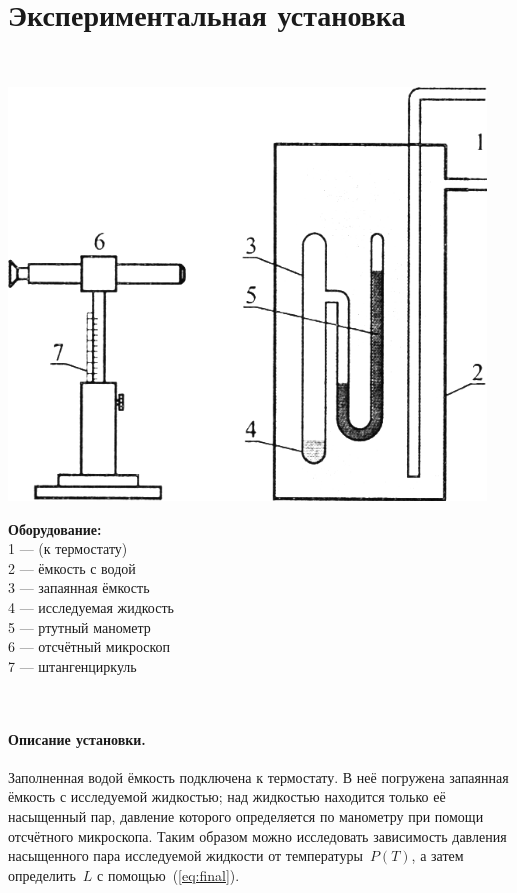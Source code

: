 \documentclass[12pt]{article}
\begin{document}
		\section*{Экспериментальная установка}
		~\hfill
		\begin{minipage}{0.35\textwidth}
			\includegraphics[width=0.95\textwidth]{apparatus}
		\end{minipage}
		\hfill
		\begin{minipage}{0.35\textwidth}
			\textbf{Оборудование:} \\[.5ex]
			1 --- (к термостату) \\
			2 --- ёмкость с водой \\
			3 --- запаянная ёмкость \\
			4 --- исследуемая жидкость \\
			5 --- ртутный манометр \\
			6 --- отсчётный микроскоп \\
			7 --- штангенциркуль
		\end{minipage}
		\hfill~
		
		\bigskip
		\paragraph{Описание установки.} Заполненная водой ёмкость подключена
		к термостату. В неё погружена запаянная ёмкость с исследуемой жидкостью;
		над жидкостью находится только её насыщенный пар, давление которого
		определяется по манометру при помощи отсчётного микроскопа.
		Таким образом можно исследовать зависимость давления насыщенного пара
		исследуемой жидкости от температуры~$P(T)$, а затем определить~$L$
		с помощью~(\ref{eq:final}).
		
\end{document}
